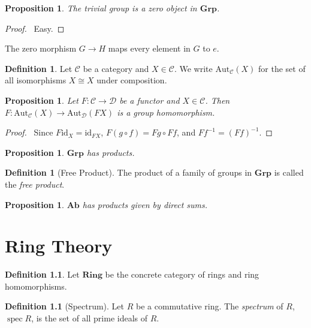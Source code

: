 \documentclass{book}
\let\qed\relax
\newtheorem{prop}[ax]{Proposition}
\theoremstyle{definition}
\newtheorem{df}[ax]{Definition}
\newcommand{\id}[1]{\ensuremath{\mathrm{id}_{#1}}}
\newcommand{\inv}[1]{\ensuremath{{#1}^{-1}}}
\newcommand{\spec}{\ensuremath{\operatorname{spec}}}
\begin{document}
\begin{prop}
The trivial group is a zero object in $\mathbf{Grp}$.
\end{prop}

\begin{proof}
\pf\ Easy. \qed
\end{proof}

The zero morphism $G \rightarrow H$ maps every element in $G$ to $e$.

\begin{df}
Let $\mathcal{C}$ be a category and $X \in \mathcal{C}$. We write $\mathrm{Aut}_\mathcal{C}(X)$ for the set of all isomorphisms $X \cong X$ under composition.
\end{df}

\begin{prop}
Let $F : \mathcal{C} \rightarrow \mathcal{D}$ be a functor and $X \in \mathcal{C}$. Then $F : \mathrm{Aut}_\mathcal{C}(X) \rightarrow \mathrm{Aut}_\mathcal{D}(FX)$ is a group homomorphism.
\end{prop}

\begin{proof}
\pf\ Since $F \id{X} = \id{FX}$, $F(g \circ f) = Fg \circ Ff$, and $F \inv{f} = \inv{(Ff)}$. \qed
\end{proof}

\begin{prop}
$\mathbf{Grp}$ has products.
\end{prop}

\begin{df}[Free Product]
The product of a family of groups in $\mathbf{Grp}$ is called the \emph{free product}.
\end{df}

\begin{prop}
$\mathbf{Ab}$ has products given by direct sums.
\end{prop}

\chapter{Ring Theory}

\begin{df}
Let $\mathbf{Ring}$ be the concrete category of rings and ring homomorphisms.
\end{df}

\begin{df}[Spectrum]
Let $R$ be a commutative ring. The \emph{spectrum} of $R$, $\spec R$, is the set of all prime ideals of $R$.
\end{df}
\end{document}
